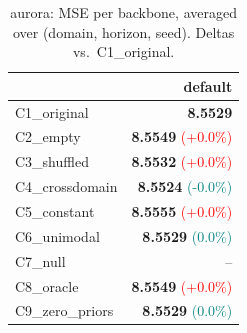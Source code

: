 \begin{table}[t]
\caption{aurora: MSE per backbone, averaged over (domain, horizon, seed). Deltas vs.\ C1\_original.}
\label{tab:bb_aurora}
\centering
\small
\begin{tabular}{lr}
\toprule
 & default \\
\midrule
C1\_original & \textbf{8.5529} \\
C2\_empty & \textbf{8.5549} {\tiny \textcolor{red}{(+0.0\%)}} \\
C3\_shuffled & \textbf{8.5532} {\tiny \textcolor{red}{(+0.0\%)}} \\
C4\_crossdomain & \textbf{8.5524} {\tiny \textcolor{teal}{(-0.0\%)}} \\
C5\_constant & \textbf{8.5555} {\tiny \textcolor{red}{(+0.0\%)}} \\
C6\_unimodal & \textbf{8.5529} {\tiny \textcolor{teal}{(0.0\%)}} \\
C7\_null & -- \\
C8\_oracle & \textbf{8.5549} {\tiny \textcolor{red}{(+0.0\%)}} \\
C9\_zero\_priors & \textbf{8.5529} {\tiny \textcolor{teal}{(0.0\%)}} \\
\bottomrule
\end{tabular}
\end{table}
